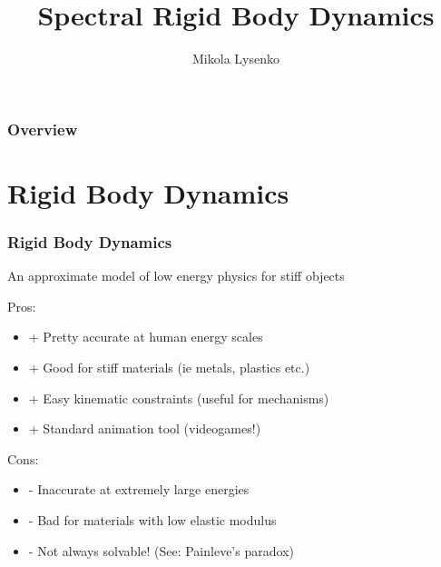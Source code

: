 \documentclass{beamer}
\title{Spectral Rigid Body Dynamics}
\author{Mikola Lysenko}
\begin{document}
\lstset{ %
language=Python,                %
basicstyle=\footnotesize,       %
showspaces=false,               %
showstringspaces=false,         %
showtabs=false,                 %
frame=single,	                %
tabsize=4,	                %
captionpos=b,                   %
breaklines=true,                %
breakatwhitespace=false}

\newcommand{\R}{\mathbb{R}}
\newcommand{\ind}[1]{{\bf 1}_{#1}}
\newcommand{\inner}[2]{\left \langle #1 , #2 \right \rangle}

\maketitle

\begin{frame}
	\frametitle{Overview}
		\tableofcontents
\end{frame}

\section{Rigid Body Dynamics}
\begin{frame}
\frametitle{Rigid Body Dynamics}
An approximate model of low energy physics for stiff objects

\pause
\vskip15pt
Pros:
\begin{itemize}
	\item{+} Pretty accurate at human energy scales
	\item{+} Good for stiff materials (ie metals, plastics etc.)
	\item{+} Easy kinematic constraints (useful for mechanisms)
	\item{+} Standard animation tool (videogames!)
\end{itemize}

\pause
\vskip15pt
Cons:
\begin{itemize}
	\item{-} Inaccurate at extremely large energies
	\item{-} Bad for materials with low elastic modulus
	\item{-} Not always solvable! (See: Painleve's paradox)
\end{itemize}
\end{frame}
\end{document}
